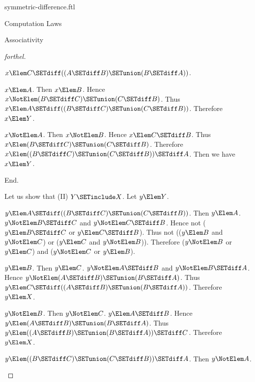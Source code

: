 \documentclass{stex}
\begin{document}
\begin{smodule}{symmetric-difference.ftl}
\begin{sfragment}{Computation Laws}
\begin{sfragment}{Associativity}
\begin{proof}[forthel]
\begin{case}{$x \Elem C \SETdiff ((A \SETdiff B) \SETunion (B \SETdiff A))$.}
          \begin{case}{$x \Elem A$.}
            Then $x \Elem B$.
            Hence $x \NotElem (B \SETdiff C) \SETunion (C \SETdiff B)$.
            Thus $x \Elem A \SETdiff ((B \SETdiff C) \SETunion (C \SETdiff B))$.
            Therefore $x \Elem Y$.
          \end{case}

          \begin{case}{$x \NotElem A$.}
            Then $x \NotElem B$.
            Hence $x \Elem C \SETdiff B$.
            Thus $x \Elem (B \SETdiff C) \SETunion (C \SETdiff B)$.
            Therefore $x \Elem ((B \SETdiff C) \SETunion (C \SETdiff B)) \SETdiff A$.
            Then we have $x \Elem Y$.
          \end{case}
        \end{case}
      End.

      Let us show that (II) $Y \SETinclude X$.
        Let $y \Elem Y$.

        \begin{case}{$y \Elem A \SETdiff ((B \SETdiff C) \SETunion (C \SETdiff B))$.}
          Then $y \Elem A$.
          $y \NotElem B \SETdiff C$ and $y \NotElem C \SETdiff B$.
          Hence not ($y \Elem B \SETdiff C$ or $y \Elem C \SETdiff B$).
          Thus not (($y \Elem B$ and $y \NotElem C$) or ($y \Elem C$ and $y \NotElem B$)).
          Therefore ($y \NotElem B$ or $y \Elem C$) and ($y \NotElem C$ or $y \Elem B$).

          \begin{case}{$y \Elem B$.}
            Then $y \Elem C$.
            $y \NotElem A \SETdiff B$ and $y \NotElem B \SETdiff A$.
            Hence $y \NotElem (A \SETdiff B) \SETunion (B \SETdiff A)$.
            Thus $y \Elem C \SETdiff ((A \SETdiff B) \SETunion (B \SETdiff A))$.
            Therefore $y \Elem X$.
          \end{case}

          \begin{case}{$y \NotElem B$.}
            Then $y \NotElem C$.
            $y \Elem A \SETdiff B$.
            Hence $y \Elem (A \SETdiff B) \SETunion (B \SETdiff A)$.
            Thus $y \Elem ((A \SETdiff B) \SETunion (B \SETdiff A)) \SETdiff C$.
            Therefore $y \Elem X$.
          \end{case}
        \end{case}

        \begin{case}{$y \Elem ((B \SETdiff C) \SETunion (C \SETdiff B)) \SETdiff A$.}
          Then $y \NotElem A$.


\end{case}
\end{proof}
\end{sfragment}
\end{sfragment}
\end{smodule}
\end{document}
